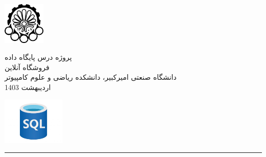 \begin{minipage}{0.1\textwidth}
\includegraphics[width=2cm]{etc/aut}
\end{minipage}%
\hfill%
\begin{minipage}{0.6\textwidth}\centering
\fontsize{10pt}{10pt}\selectfont
پروژه درس پایگاه داده \\
فروشگاه آنلاین\\ 
\vspace{0.25cm}
\begingroup
\fontsize{8pt}{8pt}\selectfont
دانشگاه صنعتی امیرکبیر، دانشکده ریاضی و علوم کامپیوتر \\
اردیبهشت 1403  \\
\endgroup
\end{minipage}%
\hfill%
\begin{minipage}{0.1\textwidth}
\includegraphics[width=3cm]{etc/database log.jpg}
\end{minipage}

\vspace{0.5cm}

\noindent\rule{\textwidth}{1pt}